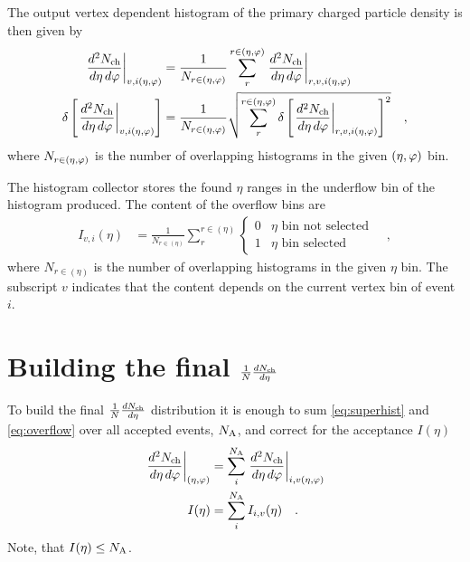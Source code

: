 \documentclass[11pt]{article}
\begin{document}
The output vertex dependent histogram of the primary
charged particle density is then given by
\begin{align}
  \label{eq:superhist}
  \dndetadphi[v,i\etaphi] &=
  \frac{1}{N_{r\in\etaphi}}\sum_{r}^{r\in\etaphi}  
  \dndetadphi[r,v,i\etaphi]\\
  \delta\left[\dndetadphi[v,i\etaphi]\right] &=
  \frac{1}{N_{r\in\etaphi}}\sqrt{\sum_{r}^{r\in\etaphi}   
    \delta\left[\dndetadphi[r,v,i\etaphi]\right]^2}
  \quad,
\end{align}
where $N_{r\in(\eta,\varphi)}$ is the number of overlapping histograms
in the given $(\eta,\varphi)$ bin. 

The histogram collector stores the found $\eta$ ranges in the
underflow bin of the histogram produced.  The content of the overflow
bins are 
\begin{align}
  \label{eq:overflow}
  I_{v,i}(\eta) &= 
  \frac{1}{N_{r\in(\eta)}}
  \sum_{r}^{r\in(\eta)} \left\{\begin{array}{cl} 
      0 & \eta \text{\ bin not selected}\\ 
      1 & \eta \text{\ bin selected}
      \end{array}\right.\quad,
\end{align}
where $N_{r\in(\eta)}$ is the number of overlapping histograms in the
given $\eta$ bin.  The subscript $v$ indicates that the content
depends on the current vertex bin of event $i$.

\section{Building the final $\dndeta$}
\label{sec:ana_aod}

To build the final $\dndeta$ distribution it is enough to sum
\eqref{eq:superhist} and \eqref{eq:overflow} over all accepted
events, ${N_{\text{A}}}$, and correct for the acceptance $I(\eta)$ 
\begin{align}
  \dndetadphi[\etaphi] &= \sum_i^{\NA}\dndetadphi[i,v\etaphi]\\ 
  I(\eta) &= \sum_i^{\NA}I_{i,v}(\eta)\quad.
\end{align}
Note, that $I(\eta)\le{\ensuremath N_{\text{A}}}$.  
\end{document}
